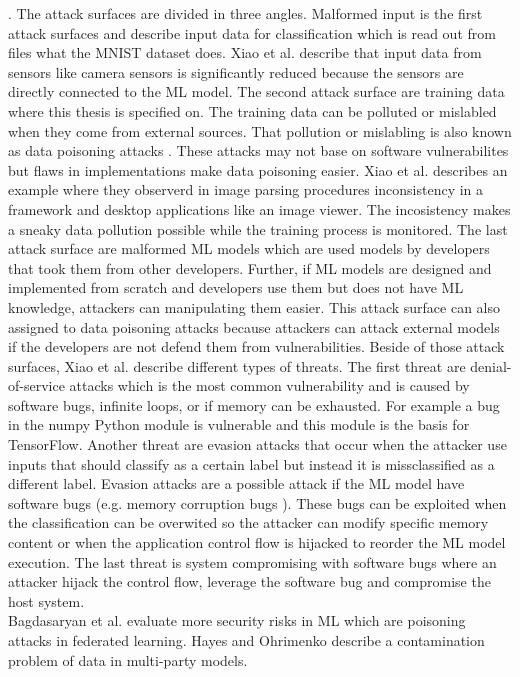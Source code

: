 \cite{lecun_cortes_burges_2017}. The attack surfaces are divided in three angles. Malformed input is the first attack surfaces and describe input data for classification which is read out from files what the MNIST dataset does. Xiao et al. describe that input data from sensors like camera sensors is significantly reduced because the sensors are directly connected to the ML model. The second attack surface are training data where this thesis is specified on. The training data can be polluted or mislabled when they come from external sources. That pollution or mislabling is also known as data poisoning attacks \cite{DBLP:conf/icml/BiggioNL12}. These attacks may not base on software vulnerabilites but flaws in implementations make data poisoning easier. Xiao et al. describes an example where they observerd in image parsing procedures inconsistency in a framework and desktop applications like an image viewer. The incosistency makes a sneaky data pollution possible while the training process is monitored. The last attack surface are malformed ML models which are used models by developers that took them from other developers. Further, if ML models are designed and implemented from scratch and developers use them but does not have ML knowledge, attackers can manipulating them easier. This attack surface can also assigned to data poisoning attacks because attackers can attack external models if the developers are not defend them from vulnerabilities. Beside of those attack surfaces, Xiao et al. describe different types of threats. The first threat are denial-of-service attacks which is the most common vulnerability and is caused by software bugs, infinite loops, or if memory can be exhausted. For example a bug in the numpy Python module is vulnerable and this module is the basis for TensorFlow. Another threat are evasion attacks that occur when the attacker use inputs that should classify as a certain label but instead it is missclassified as a different label. Evasion attacks are a possible attack if the ML model have software bugs (e.g. memory corruption bugs \cite{DBLP:conf/mipro/Novkovic21}). These bugs can be exploited when the classification can be overwited so the attacker can modify specific memory content or when the application control flow is hijacked to reorder the ML model execution. The last threat is system compromising with software bugs where an attacker hijack the control flow, leverage the software bug and compromise the host system. \\ Bagdasaryan et al. \cite{Bagdasaryan2020HowTB} evaluate more security risks in ML which are poisoning attacks in federated learning. Hayes and Ohrimenko \cite{Hayes2018ContaminationAA} describe a contamination problem of data in multi-party models.

